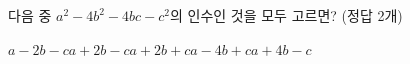 다음 중 $a^2-4b^2-4bc-c^2$의 인수인 것을 모두 고르면? (정답 2개)
\begin{choices32}{$a-2b-c$}{$a+2b-c$}{$a+2b+c$}{$a-4b+c$}{$a+4b-c$}\end{choices32}
